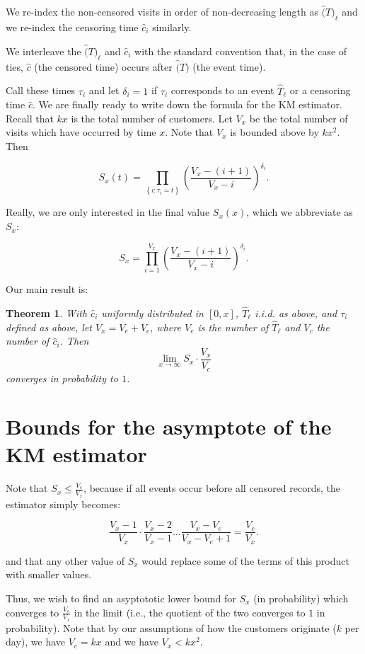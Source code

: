 \documentclass[11pt]{article}
\newtheorem{theorem}{Theorem}
\theoremstyle{definition}
\begin{document}
We re-index the non-censored visits in order of non-decreasing length as $\widehat(T)_\ell$
and we re-index the censoring time $\widehat{c}_i$ similarly. 

We interleave the $\widehat(T)_\ell$ and $\widehat{c}_i$ with the standard convention that, in the case of ties,
$\widehat{c}$ (the censored time) occurs after $\widehat(T)$ (the event time).

Call these times $\tau_i$ and let $\delta_i=1$ if $\tau_i$ corresponds to an event $\widehat{T}_\ell$ 
or a censoring time $\widehat{c}$.  We are finally ready to write down the formula for the KM estimator.
Recall that $kx$ is the total number of customers.  Let $V_x$ be the total number of visits 
which have occurred by time $x$.  Note that $V_x$ is bounded above by $kx^2$.  Then


\[S_x(t) = \prod_{\left\{i : \tau_i = t\right\}}{\left(\frac{V_x-(i+1)}{V_x-i}\right)^{\delta_i}}.\]

Really, we are only interested in the final value $S_x(x)$, which we abbreviate as $S_x$:

\[S_x = \prod_{i=1}^{V_x} \left(\frac{V_x-(i+1)}{V_x-i}\right)^{\delta_i}.\]

Our main result is:

\begin{theorem}
    With $\widehat{c}_i$ uniformly distributed in $\left[0,x\right]$, $\widehat{T}_{\ell}$ i.i.d. as above,
    and $\tau_i$ defined as above, let $V_x=V_e + V_c$, where $V_e$ is the number of $\widehat{T}_{\ell}$ and $V_c$
    the number of $\widehat{c}_i$.  Then 
\[\lim_{x\rightarrow \infty} S_x \cdot \frac{V_x}{V_c} \] converges in probability to $1$.
\end{theorem}

\section{Bounds for the asymptote of the KM estimator}

Note that $S_x \le \frac{V_c}{V_x}$, because if all events occur before all censored records, the estimator simply becomes:

\[\frac{V_x-1}{V_x} \cdot \frac{V_x-2}{V_x-1}\dots \frac{V_x-V_e}{V_x-V_e+1} = \frac{V_c}{V_x}.\]

and that any other value of $S_x$ would replace some of the terms of this product with smaller values.

Thus, we wish to find an asyptototic lower bound for $S_x$ (in probability) which converges
to $\frac{V_c}{V_x}$ in the limit (i.e., the quotient of the two converges to $1$ in probability).  
Note that by our assumptions of how the customers originate ($k$ per day), we have
$V_c=kx$ and we have $V_x < kx^2$.
\end{document}
